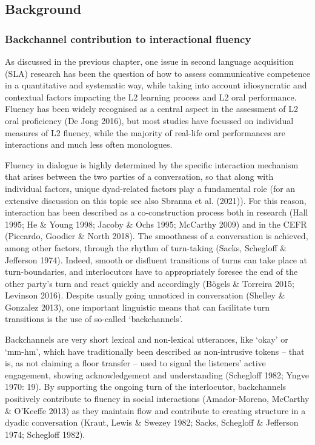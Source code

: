 \subsection[Background]{Background}
\hypertarget{Toc191305942}{}\subsubsection[Backchannel contribution to interactional fluency]{Backchannel contribution to interactional fluency}
\hypertarget{Toc191305943}{}\begin{styleStandard}
As discussed in the previous chapter, one issue in second language acquisition (SLA) research has been the question of how to assess communicative competence in a quantitative and systematic way, while taking into account idiosyncratic and contextual factors impacting the L2 learning process and L2 oral performance. Fluency has been widely recognised as a central aspect in the assessment of L2 oral proficiency (De Jong 2016), but most studies have focussed on individual measures of L2 fluency, while the majority of real-life oral performances are interactions and much less often monologues.
\end{styleStandard}

\begin{styleStandard}
Fluency in dialogue is highly determined by the specific interaction mechanism that arises between the two parties of a conversation, so that along with individual factors, unique dyad-related factors play a fundamental role (for an extensive discussion on this topic see also Sbranna et al. (2021)). For this reason, interaction has been described as a co-construction process both in research (Hall 1995; He \& Young 1998; Jacoby \& Ochs 1995; McCarthy 2009) and in the CEFR (Piccardo, Goodier \& North 2018). The smoothness of a conversation is achieved, among other factors, through the rhythm of turn-taking (Sacks, Schegloff \& Jefferson 1974). Indeed, smooth or disfluent transitions of turns can take place at turn-boundaries, and interlocutors have to appropriately foresee the end of the other party’s turn and react quickly and accordingly (Bögels \& Torreira 2015; Levinson 2016). Despite usually going unnoticed in conversation (Shelley \& Gonzalez 2013), one important linguistic means that can facilitate turn transitions is the use of so-called ‘backchannels’.
\end{styleStandard}

\begin{styleStandard}
Backchannels are very short lexical and non-lexical utterances, like ‘okay’ or ‘mm-hm’, which have traditionally been described as non-intrusive tokens – that is, as not claiming a floor transfer – used to signal the listeners’ active engagement, showing acknowledgement and understanding (Schegloff 1982; Yngve 1970: 19). By supporting the ongoing turn of the interlocutor, backchannels positively contribute to fluency in social interactions (Amador-Moreno, McCarthy \& O’Keeffe 2013) as they maintain flow and contribute to creating structure in a dyadic conversation (Kraut, Lewis \& Swezey 1982; Sacks, Schegloff \& Jefferson 1974; Schegloff 1982).
\end{styleStandard}

